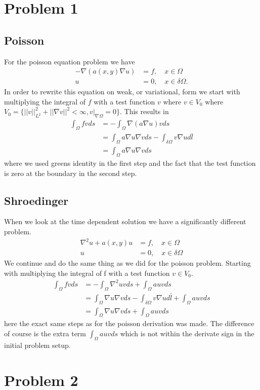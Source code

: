 \documentclass[11pt]{article}
\begin{document}
\section{Problem 1}
\subsection{Poisson}
For the poisson equation problem we have
\begin{align}
	-\nabla (a(x,y)\nabla u) &= f,\quad x\in \Omega \\
	u &= 0,\quad x\in \delta \Omega.
\end{align}
In order to rewrite this equation on weak, or variational, form we start with multiplying the integral of $f$ with a test function $v$ where $v\in V_0$ where $V_0 = \{ ||v||^2_{L^2} + ||\nabla v||^2 < \infty, v|_{\nabla \Omega} = 0\}$. This results in
\begin{align}
	\int_{\Omega} f v d s &= - \int_{\Omega} \nabla (a \nabla u) v ds \\
	&= \int_{\Omega} a \nabla u \nabla v ds - \int_{\delta \Omega} v \nabla u d\bar{l} \\
	&= \int_{\Omega} a \nabla u \nabla v ds
\end{align}
where we used greens identity in the first step and the fact that the test function is zero at the boundary in the second step.
\subsection{Shroedinger}
When we look at the time dependent solution we have a significantly different problem.
\begin{align}
	\nabla^2 u + a(x,y) u &= f, \quad x\in \Omega \\
	u &= 0, \quad x \in \delta \Omega
\end{align}
We continue and do the same thing as we did for the poisson problem. Starting with multiplying the integral of f with a test function $v \in V_0$.
\begin{align}
	\int_{\Omega} f v d s &= - \int_{\Omega} \nabla^2 u v ds + \int_{\Omega} auv ds \\
	&= \int_{\Omega} \nabla u\nabla vds-\int_{\delta\Omega} v \nabla u d\bar{l} + \int_{\Omega} auvds \\
	&= \int_{\Omega} \nabla u \nabla v ds + \int_{\Omega} a u v ds
\end{align}
here the exact same steps as for the poisson derivation was made. The difference of course is the extra term $\int_{\Omega} a u v ds$ which is not within the derivate sign in the initial problem setup.

\section{Problem 2}

	
\end{document}
